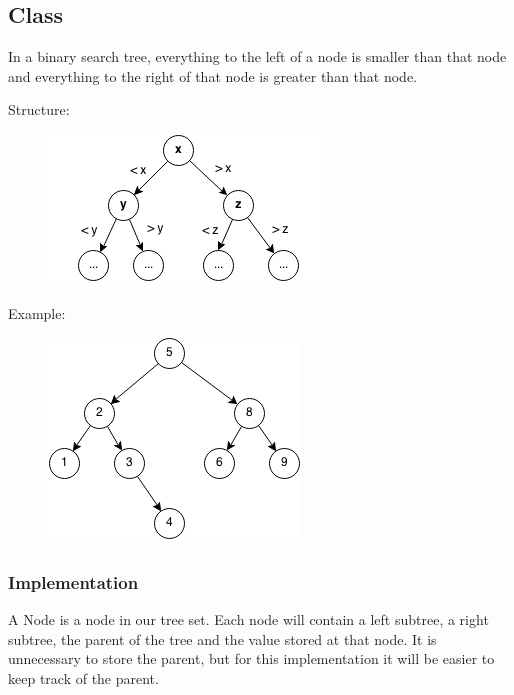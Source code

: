 \documentclass[11pt,oneside]{book}
\makeatletter
\def\maxwidth#1{\ifdim\Gin@nat@width>#1 #1\else\Gin@nat@width\fi}
\makeatother
\begin{document}
\subsection{Class}

In a binary search tree, everything to the left of a node is smaller than that node and everything to the right of that node is greater than that node.

Structure:

\vspace{5px}\begin{figure}[H]\centering
        \includegraphics[width=0.66\maxwidth{\textwidth}]{bstcompare.png}
        \end{figure}

Example:

\vspace{5px}\begin{figure}[H]\centering
        \includegraphics[width=0.66\maxwidth{\textwidth}]{bst.png}
        \end{figure}

\subsubsection{Implementation}

A Node is a node in our tree set. Each node will contain a left subtree, a right subtree, the parent of the tree and the value stored at that node. It is unnecessary to store the parent, but for this implementation it will be easier to keep track of the parent.
\end{document}
